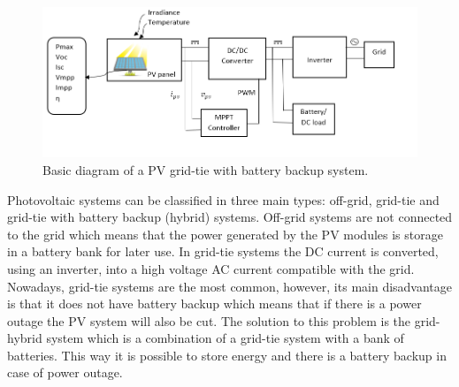 \begin{figure}[htbp]
	\includegraphics[width=\linewidth]{../Pictures/PV_system_blocks}
	\caption{Basic diagram of a PV grid-tie with battery backup system.}
	\label{fig:PVsystemblocks}
\end{figure}

Photovoltaic systems can be classified in three main types: off-grid, grid-tie and grid-tie with battery backup (hybrid) systems. Off-grid systems are not connected to the grid which means that the power generated by the PV modules is storage in a battery bank for later use. In grid-tie systems the DC current is converted, using an inverter, into a high voltage AC current compatible with the grid. Nowadays, grid-tie systems are the most common, however, its main disadvantage is that it does not have battery backup which means that if there is a power outage the PV system will also be cut.  The solution to this problem is the grid-hybrid system which is a combination of a grid-tie system with a bank of batteries. This way it is possible to store energy and there is a battery backup in case of power outage. %

\newpage

